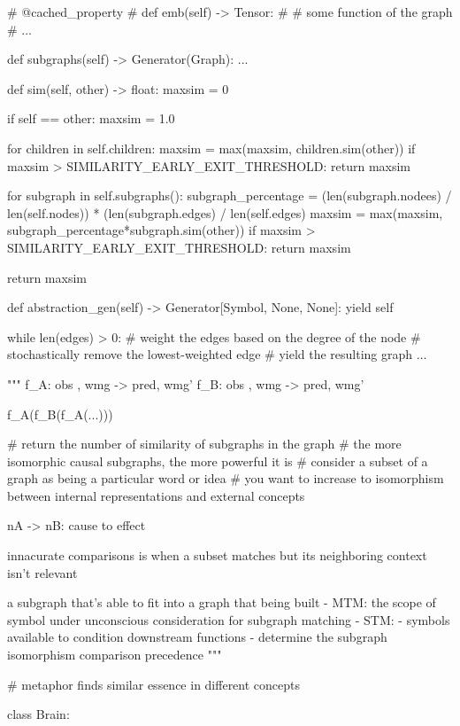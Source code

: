     \# @cached_property
    \# def emb(self) -> Tensor:
    \#     \# some function of the graph
    \#     ...

    def subgraphs(self) -> Generator(Graph):
        ...

    def sim(self, other) -> float:
        maxsim = 0

        if self == other:
            maxsim = 1.0

        for children in self.children:
            maxsim = max(maxsim, children.sim(other))
            if maxsim > SIMILARITY_EARLY_EXIT_THRESHOLD:
                return maxsim

        for subgraph in self.subgraphs():
            subgraph_percentage = (len(subgraph.nodees) / len(self.nodes)) * (len(subgraph.edges) / len(self.edges)
            maxsim = max(maxsim, subgraph_percentage*subgraph.sim(other))
            if maxsim > SIMILARITY_EARLY_EXIT_THRESHOLD:
                return maxsim

        return maxsim

    def abstraction_gen(self) -> Generator[Symbol, None, None]:
        yield self

        while len(edges) > 0:
            \# weight the edges based on the degree of the node
            \# stochastically remove the lowest-weighted edge
            \# yield the resulting graph
            ...

"""
f_A: obs , wmg -> pred, wmg'
f_B: obs , wmg -> pred, wmg'

f_A(f_B(f_A(...)))


\# return the number of similarity of subgraphs in the graph
\# the more isomorphic causal subgraphs, the more powerful it is
\# consider a subset of a graph as being a particular word or idea
\# you want to increase to isomorphism between internal representations and external concepts

nA -> nB: cause to effect

innacurate comparisons is when a subset matches but its neighboring context isn't relevant

a subgraph that's able to fit into a graph that being built
- MTM: the scope of symbol under unconscious consideration for subgraph matching
- STM:
    - symbols available to condition downstream functions
    - determine the subgraph isomorphism comparison precedence
"""

\# metaphor finds similar essence in different concepts

class Brain:

